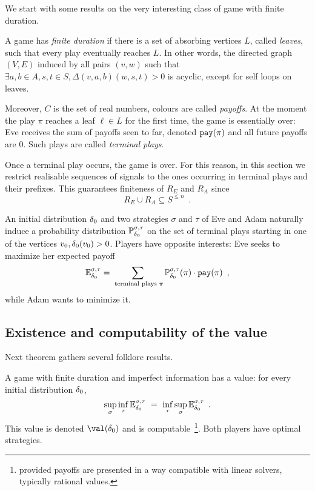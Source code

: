 We start with some results on the very interesting class of game
with finite duration.

A game has \emph{finite duration}
if there is a set of absorbing vertices $L$, called \emph{leaves},
such that every play eventually reaches $L$.
In other words, the directed graph $(V,E)$ induced by all pairs $(v,w)$
such that 
$\exists a,b\in A, s,t \in S, \Delta(v,a,b)(w,s,t) > 0$
is acyclic, except for self loops on leaves.

Moreover, $C$ is the set of real numbers,
colours are called \emph{payoffs}.
At the moment the play $\pi$ reaches a leaf $\ell\in L$
for the first time,
the game is essentially over:
Eve receives the sum of payoffs seen to far,
denoted ${\tt pay}(\pi)$ and all future payoffs are $0$.
Such plays are called \emph{terminal plays}.

Once a terminal play occurs, the game is over.
For this reason, in this section we restrict realisable sequences of signals
to the ones occurring in terminal plays and their prefixes.
This guarantees finiteness of $R_E$ and $R_A$ since
\[
R_E \cup R_A \subseteq S^{\leq n}\enspace.
\]


An initial distribution $\delta_0$ and two strategies $\sigma$ and $\tau$ of Eve and Adam naturally induce a probability distribution $\mathbb{P}_{\delta_0}^{\sigma,\tau}$
on the set of terminal plays starting in one of the vertices $v_0, \delta_0(v_0)>0$.
Players have opposite interests:
Eve seeks to maximize her expected payoff
\[
\mathbb{E}_{\delta_0}^{\sigma,\tau}= \sum_{\text{ terminal plays }\pi} 
\mathbb{P}_{\delta_0}^{\sigma,\tau}(\pi) \cdot { {\tt pay}}(\pi)\enspace,
\]
while Adam wants to minimize it.


\subsection{Existence and computability of the value}
\label{8-subsec:value}

Next theorem gathers several folklore results.

\begin{theorem}
\label{8-thm:finiteimperfecthaveval}
A game with finite duration and imperfect information has a value:
for every initial distribution $\delta_0$,
\[
\sup_\sigma \inf_\tau \mathbb{E}_{\delta_0}^{\sigma,\tau}
~=~
 \inf_\tau \sup_\sigma \mathbb{E}_{\delta_0}^{\sigma,\tau}\enspace.
\]
This value is denoted $\val(\ini)$
and is computable~\footnote{provided payoffs are presented in a way
compatible with linear solvers, typically 
rational values.}.
Both players have optimal strategies.
\end{theorem}

